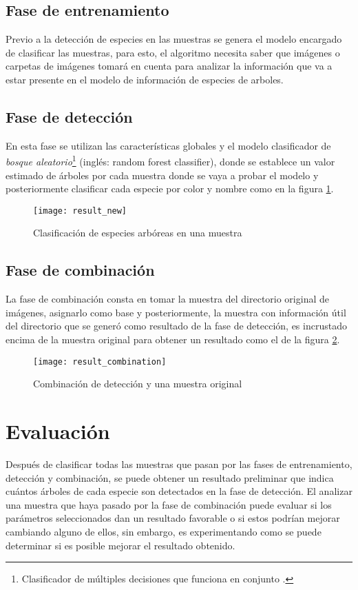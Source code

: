 \documentclass[review]{elsarticle}
\begin{document}
\subsection{Fase de entrenamiento}
Previo a la detección de especies en las muestras se genera el modelo encargado de clasificar las muestras, para esto, el algoritmo necesita saber que imágenes o carpetas de imágenes tomará en cuenta para analizar la información que va a estar presente en el modelo de información de especies de arboles. 

\subsection{Fase de detección}
En esta fase se utilizan las características globales y el modelo clasificador de {\em bosque aleatorio}\footnote{Clasificador de múltiples decisiones que funciona en conjunto \citep{rf23}.} (inglés: random forest classifier), donde se establece un valor estimado de árboles por cada muestra donde se vaya a probar el modelo y posteriormente clasificar cada especie por color y nombre como en la figura \ref{Clasificación de especies arbóreas en una muestra}.
\\

\begin{figure}[H]
  \centering
         \texttt{[image: result\_new]}
    \caption{Clasificación de especies arbóreas en una muestra}
    \label{Clasificación de especies arbóreas en una muestra}
\end{figure}

\subsection{Fase de combinación}
La fase de combinación consta en tomar la muestra del directorio original de imágenes, asignarlo como base y posteriormente, la muestra con información útil del directorio que se generó como resultado de la fase de detección, es incrustado encima de la muestra original para obtener un resultado como el de la figura \ref{Combinación de detección y una muestra original}.


\begin{figure}[H]
  \centering
  \texttt{[image: result\_combination]}
    \caption{Combinación de detección y una muestra original}
    \label{Combinación de detección y una muestra original}
\end{figure}
\clearpage

\section{Evaluación}
Después de clasificar todas las muestras que pasan por las fases de entrenamiento, detección y combinación, se puede obtener un resultado preliminar que indica  cuántos árboles de cada especie son detectados en la fase de detección. El analizar una muestra que haya pasado por la fase de combinación puede evaluar si los parámetros seleccionados dan un resultado favorable o si estos podrían mejorar cambiando alguno de ellos, sin embargo, es experimentando como se puede determinar si es posible mejorar el resultado obtenido.\\
\end{document}
